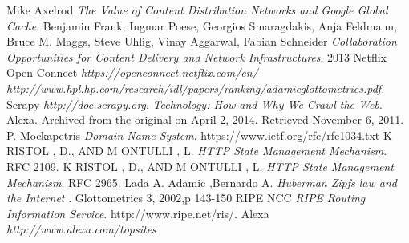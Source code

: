 \begin{thebibliography}{}
Mike Axelrod
\textit{The Value of Content Distribution Networks and Google Global Cache}.
Benjamin Frank, Ingmar Poese, Georgios Smaragdakis,
Anja Feldmann, Bruce M. Maggs, Steve Uhlig,
Vinay Aggarwal, Fabian Schneider
\textit{Collaboration Opportunities for
Content Delivery and Network Infrastructures}.
2013
Netflix Open Connect
\textit{https://openconnect.netflix.com/en/}
\textit{http://www.hpl.hp.com/research/idl/papers/ranking/adamicglottometrics.pdf.}
Scrapy
\textit{http://doc.scrapy.org}.
\textit{Technology: How and Why We Crawl the Web}. 
Alexa. Archived from the original on April 2, 2014. Retrieved November 6, 2011.
P. Mockapetris
\textit{Domain Name System}.
https://www.ietf.org/rfc/rfc1034.txt
K RISTOL , D., AND M ONTULLI , L. 
\textit{HTTP State Management Mechanism}.
RFC 2109.
K RISTOL , D., AND M ONTULLI , L.
\textit{HTTP State Management Mechanism}.
RFC 2965.
Lada A. Adamic ,Bernardo A. 
\textit{Huberman Zipfs law and the Internet} . 
Glottometrics 3, 2002,p 143-150
RIPE NCC
\textit{RIPE Routing Information Service}.
http://www.ripe.net/ris/.
Alexa
\textit{http://www.alexa.com/topsites}
\end{thebibliography}
